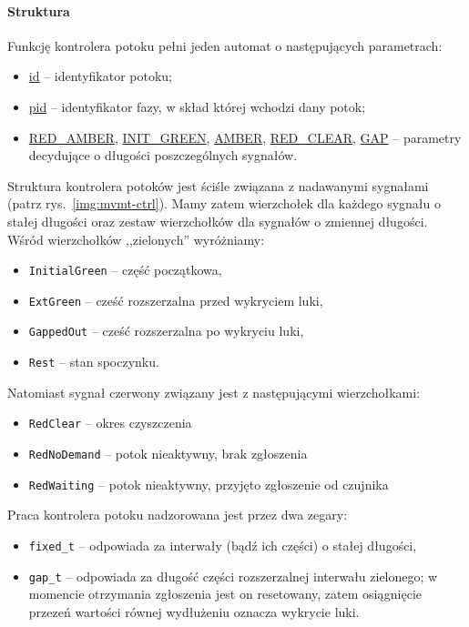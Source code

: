 \documentclass{pracamgr}
\newcommand{\imgr}[1]{rys.~\ref{#1}}
\theoremstyle{plain}
\begin{document}
\paragraph{Struktura} Funkcję kontrolera potoku pełni jeden automat o
następujących parametrach:
\begin{itemize}
  \item \url{id} -- identyfikator potoku;
  \item \url{pid} -- identyfikator fazy, w skład której wchodzi dany potok;
  \item \url{RED_AMBER}, \url{INIT_GREEN}, \url{AMBER},
  \url{RED_CLEAR}, \url{GAP} -- parametry decydujące o długości
  poszczególnych sygnałów.
\end{itemize}
Struktura kontrolera potoków jest ściśle związana z nadawanymi
sygnałami (patrz \imgr{img:mvmt-ctrl}). Mamy zatem wierzchołek dla
każdego sygnału o stałej długości oraz zestaw wierzchołków dla
sygnałów o zmiennej długości. Wśród wierzchołków ,,zielonych''
wyróżniamy:
\begin{itemize}
  \item \texttt{InitialGreen} -- część początkowa,
  \item \texttt{ExtGreen} -- cześć rozszerzalna przed wykryciem luki,
  \item \texttt{GappedOut} -- cześć rozszerzalna po wykryciu luki,
  \item \texttt{Rest} -- stan spoczynku.
\end{itemize}
Natomiast sygnał czerwony związany jest z następującymi wierzchołkami:
\begin{itemize}
  \item \texttt{RedClear} -- okres czyszczenia
  \item \texttt{RedNoDemand} -- potok nieaktywny, brak zgłoszenia
  \item \texttt{RedWaiting} -- potok nieaktywny, przyjęto zgłoszenie
  od czujnika
\end{itemize}
Praca kontrolera potoku nadzorowana jest przez dwa zegary:
\begin{itemize}
  \item \texttt{fixed\_t} -- odpowiada za interwały (bądź ich części) o
  stałej długości,
  \item \texttt{gap\_t} -- odpowiada za długość części rozszerzalnej
  interwału zielonego; w momencie otrzymania zgłoszenia jest on
  resetowany, zatem osiągnięcie przezeń wartości równej wydłużeniu
  oznacza wykrycie luki.
\end{itemize}
\end{document}
